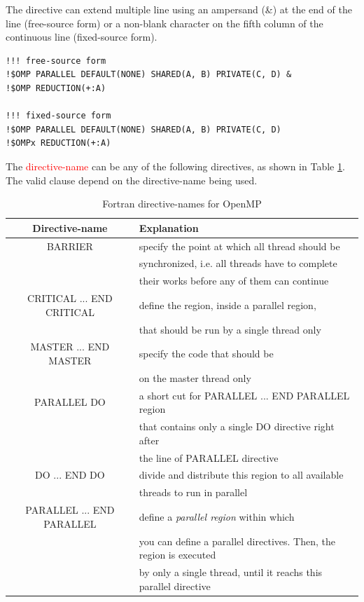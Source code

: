 The directive can extend multiple line using an ampersand (\&) at the
end of the line (free-source form) or a non-blank character on the
fifth column of the continuous line (fixed-source form).

\begin{lstlisting}
!!! free-source form
!$OMP PARALLEL DEFAULT(NONE) SHARED(A, B) PRIVATE(C, D) &
!$OMP REDUCTION(+:A)

!!! fixed-source form
!$OMP PARALLEL DEFAULT(NONE) SHARED(A, B) PRIVATE(C, D) 
!$OMPx REDUCTION(+:A)
\end{lstlisting}

The \textcolor{red}{directive-name} can be any of the following
directives, as shown in Table \ref{tab:OpenMP_Fortran_directive}. The
valid clause depend on the directive-name being used.
\begin{table}[hbt]
\begin{center}
\caption{Fortran directive-names for OpenMP}
\begin{tabular}{cl} 
\hline
Directive-name & Explanation \\ 
\hline\hline
BARRIER & specify the point at which all thread should be \\
 & synchronized, i.e. all threads have to complete \\
 & their works before any of them can continue \\
CRITICAL ... END CRITICAL & define the region, inside a parallel
region, \\
   & that should be run by a single thread only \\
MASTER ... END MASTER & specify the code that should be \\
      & on the master thread only \\
PARALLEL DO & a short cut for PARALLEL ... END PARALLEL region \\
     & that contains only a single DO directive right after \\
     & the line of PARALLEL directive \\
DO ... END DO & divide and distribute this region to all available \\
          & threads to run in parallel \\
PARALLEL ... END PARALLEL & define a {\it parallel region} within which \\
   & you can define a parallel directives. Then, the region is
   executed\\
   & by only a single thread, until it reachs this parallel
   directive\\

\end{tabular}
\end{center}
\label{tab:OpenMP_Fortran_directive}
\end{table}

